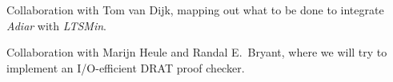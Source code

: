 \begin{itemize}

  Collaboration with Tom van Dijk, mapping out what to be done to integrate
  \emph{Adiar} with \emph{LTSMin}.


  Collaboration with Marijn Heule and Randal E.\ Bryant, where we will try to
  implement an I/O-efficient DRAT proof checker.
\end{itemize}
